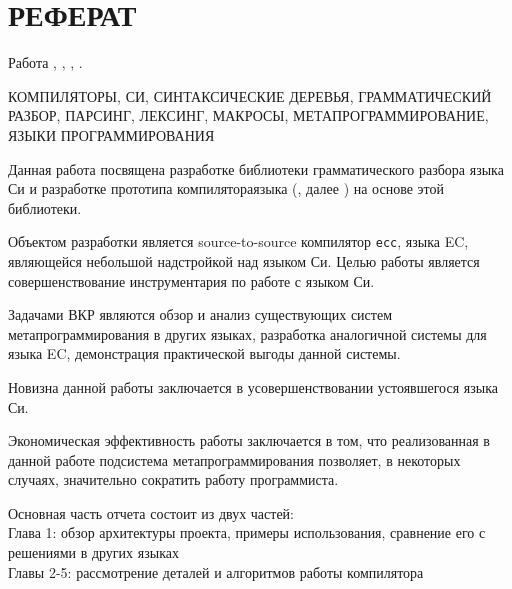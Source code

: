 \chapter*{РЕФЕРАТ}

\begin{center}
Работа , 
    ,
    ,
    .
\end{center}

    КОМПИЛЯТОРЫ, СИ, СИНТАКСИЧЕСКИЕ ДЕРЕВЬЯ, ГРАММАТИЧЕСКИЙ РАЗБОР, ПАРСИНГ, ЛЕКСИНГ, МАКРОСЫ, МЕТАПРОГРАММИРОВАНИЕ, ЯЗЫКИ ПРОГРАММИРОВАНИЯ %

    \vspace{5mm}
Данная работа посвящена разработке библиотеки грамматического разбора языка Си и разработке прототипа компилятора\break языка  (, далее ) на основе этой библиотеки.

Объектом разработки является source-to-source компилятор \verb|ecc|, языка EC, являющейся небольшой надстройкой над языком Си.
Целью работы является совершенствование инструментария по работе с языком Си.

Задачами ВКР являются обзор и анализ существующих систем метапрограммирования в других языках, 
разработка аналогичной системы для языка EC,
демонстрация практической выгоды данной системы.

Новизна данной работы заключается в усовершенствовании устоявшегося языка Си.

Экономическая эффективность работы заключается в том, что реализованная в данной работе подсистема метапрограммирования позволяет, в некоторых случаях, значительно сократить работу программиста. %

Основная часть отчета состоит из двух частей:\\
Глава 1: обзор архитектуры проекта, примеры использования, сравнение его с решениями в других языках\\
Главы 2-5: рассмотрение деталей и алгоритмов работы компилятора

